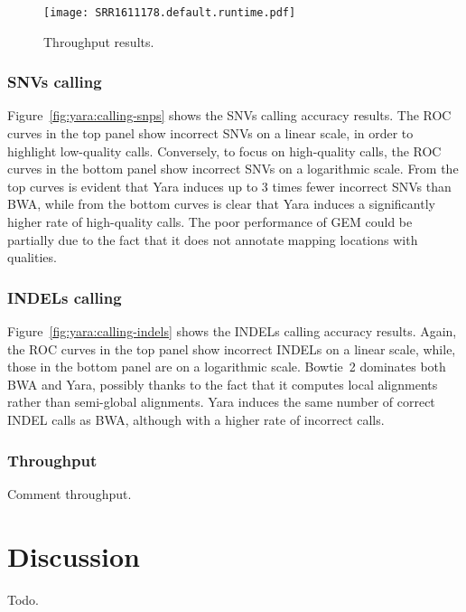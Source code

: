 \begin{figure}[t]
\begin{center}
\caption[Throughput results]{Throughput results.}
\label{fig:yara:throughput}
\texttt{[image: SRR1611178.default.runtime.pdf]}
\end{center}
\end{figure}


\subsubsection{SNVs calling}
Figure~\ref{fig:yara:calling-snps} shows the SNVs calling accuracy results.
The ROC curves in the top panel show incorrect SNVs on a linear scale, in order to highlight low-quality calls.
Conversely, to focus on high-quality calls, the ROC curves in the bottom panel show incorrect SNVs on a logarithmic scale.
From the top curves is evident that Yara induces up to 3 times fewer incorrect SNVs than BWA, while
from the bottom curves is clear that Yara induces a significantly higher rate of high-quality calls.
The poor performance of GEM could be partially due to the fact that it does not annotate mapping locations with qualities.

\subsubsection{INDELs calling}
Figure~\ref{fig:yara:calling-indels} shows the INDELs calling accuracy results.
Again, the ROC curves in the top panel show incorrect INDELs on a linear scale, while, those in the bottom panel are on a logarithmic scale.
Bowtie~2 dominates both BWA and Yara, possibly thanks to the fact that it computes local alignments rather than semi-global alignments.
Yara induces the same number of correct INDEL calls as BWA, although with a higher rate of incorrect calls.

\subsubsection{Throughput}
Comment throughput.



\section{Discussion}
Todo.

